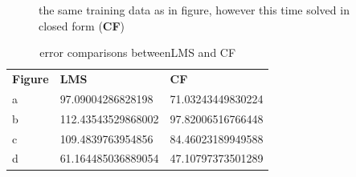 \begin{figure}[!h]
\begin{center}
\centering
{}
\end{center}
\caption{\label{fig:cf}the same training data as in figure, however this time solved in closed form (\textbf{CF}) }
\end{figure}



\begin{table}[!h]
\begin{tabular}{lll}
\textbf{Figure} & \textbf{LMS} & \textbf{CF} \\
a               &       97.09004286828198       &     71.03243449830224       \\
b               &      112.43543529868002        &     97.82006516766448          \\
c               &        109.4839763954856      &        84.46023189949588         \\
d               &        61.164485036889054      &         47.10797373501289        \\
\end{tabular}
\caption{\label{tab:error} error comparisons between{LMS} and {CF}}
\end{table}

